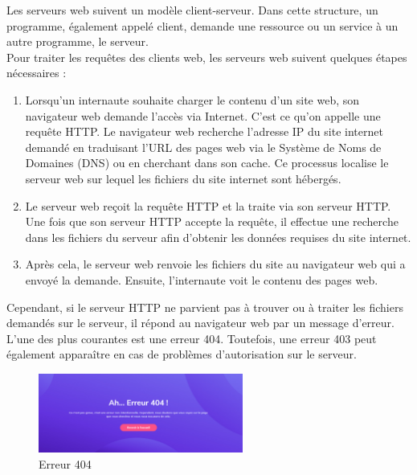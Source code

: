 Les serveurs web suivent un modèle client-serveur. Dans cette structure, un programme, également appelé client, demande une ressource ou un service à un autre programme, le serveur.\\

Pour traiter les requêtes des clients web, les serveurs web suivent quelques étapes nécessaires :

\begin{enumerate}
\item Lorsqu’un internaute souhaite charger le contenu d’un site web, son navigateur web demande l’accès via Internet. C’est ce qu’on appelle une requête HTTP. Le navigateur web recherche l’adresse IP du site internet demandé en traduisant l’URL des pages web via le Système de Noms de Domaines (DNS) ou en cherchant dans son cache. Ce processus localise le serveur web sur lequel les fichiers du site internet sont hébergés.\\

\item  Le serveur web reçoit la requête HTTP et la traite via son serveur HTTP. Une fois que son serveur HTTP accepte la requête, il effectue une recherche dans les fichiers du serveur afin d’obtenir les données requises du site internet.\\

\item  Après cela, le serveur web renvoie les fichiers du site au navigateur web qui a envoyé la demande. Ensuite, l’internaute voit le contenu des pages web.\\
\end{enumerate}


Cependant, si le serveur HTTP ne parvient pas à trouver ou à traiter les fichiers demandés sur le serveur, il répond au navigateur web par un message d’erreur. L’une des plus courantes est une erreur 404. Toutefois, une erreur 403 peut également apparaître en cas de problèmes d’autorisation sur le serveur.\\
\begin{figure}[h]
	\begin{center}
		\includegraphics[width=0.6\textwidth]{PhotoMemoire/erruer404.png}
	\end{center}
	\caption{ Erreur 404}
	
\end{figure}

